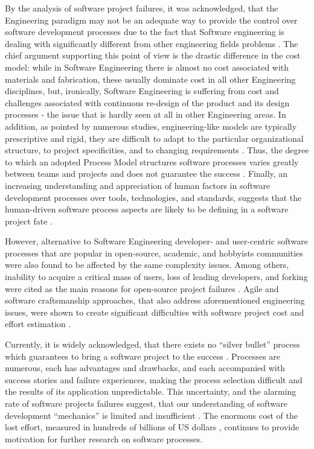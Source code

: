 By the analysis of software project failures, it was acknowledged, that the Engineering paradigm 
may not be an adequate way to provide the control over software development processes 
due to the fact that Software engineering is dealing with significantly different from other engineering 
fields problems \cite{citeulike:3729379} \cite{citeulike:5203446} \cite{citeulike:2207657}.
The chief argument supporting this point of view is the drastic difference in the cost model:
while in Software Engineering there is almost no cost associated with materials and 
fabrication, these usually dominate cost in all other Engineering disciplines, but, 
ironically, Software Engineering is suffering from cost and challenges associated with 
continuous re-design of the product and its design processes - the issue that is 
hardly seen at all in other Engineering areas. 
In addition, as pointed by numerous studies, engineering-like models are typically prescriptive and rigid,
they are difficult to adapt to the particular organizational structure, to project specificities, and to 
changing requirements \cite{citeulike:113403}. 
Thus, the degree to which an adopted Process Model structures software processes varies greatly 
between teams and projects and does not guarantee the success \cite{sacchi_2001}. 
Finally, an increasing understanding and appreciation of human factors in software development 
processes over tools, technologies, and standards, suggests that the human-driven software 
process aspects are likely to be defining in a software project fate \cite{citeulike:6580825} 
\cite{citeulike:149387} \cite{1605185} \cite{citeulike:113403} \cite{citeulike:12743107}. 

However, alternative to Software Engineering developer- and user-centric software processes that are 
popular in open-source, academic, and hobbyists communities were also found to be affected by the 
same complexity issues. Among others, inability to acquire a critical mass of users, loss of leading 
developers, and forking were cited as the main reasons for open-source project 
failures \cite{richter2007critique}. 
Agile and software craftsmanship approaches, that also address aforementioned engineering issues,
were shown to create significant difficulties with software project cost and effort 
estimation \cite{citeulike:12933080} \cite{citeulike:9928907}.

Currently, it is widely acknowledged, that there exists no ``silver bullet'' process which 
guarantees to bring a software project to the success \cite{citeulike:1986013}. 
Processes are numerous, each has advantages and drawbacks, and each accompanied with 
success stories and failure experiences, making the process selection difficult 
and the results of its application unpredictable.
This uncertainty, and the alarming rate of software projects failures suggest, that our understanding 
of software development ``mechanics'' is limited and insufficient \cite{citeulike:12550665}. 
The enormous cost of the lost effort, measured in hundreds of billions of US dollars 
\cite{citeulike:2207657} \cite{citeulike:2207653} \cite{citeulike:2207655}, 
continues to provide motivation for further research on software processes. 

